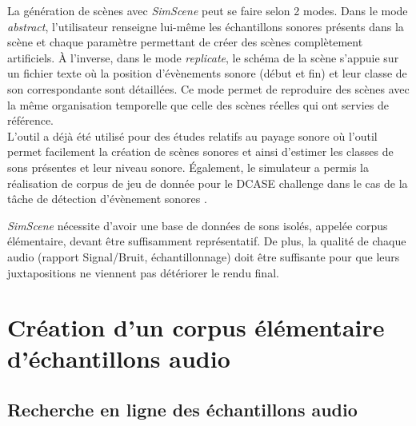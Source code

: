La génération de scènes avec \textit{SimScene} peut se faire selon 2 modes. Dans le mode \textit{abstract}, l'utilisateur renseigne lui-même les échantillons sonores présents dans la scène et chaque paramètre permettant de créer des scènes complètement artificiels. \`A l'inverse, dans le mode \textit{replicate}, le schéma de la scène s'appuie sur un fichier texte où la position d'évènements sonore (début et fin) et leur classe de son correspondante sont détaillées. Ce mode permet de reproduire des scènes avec la même organisation temporelle que celle des scènes réelles qui ont servies de référence.\\

L'outil a déjà été utilisé pour des études relatifs au payage sonore \cite{lafay2015approaching} où l'outil permet facilement la création de scènes sonores et ainsi d'estimer les classes de sons présentes et leur niveau sonore. \'Egalement, le simulateur a permis la réalisation de corpus de jeu de donnée pour le DCASE challenge \cite{stowell2015detection} dans le cas de la tâche de détection d'évènement sonores \cite{lagrange2015evaluation}. 

\textit{SimScene} nécessite d'avoir une base de données de sons isolés, appelée corpus élémentaire, devant être suffisamment représentatif. De plus, la qualité de chaque audio (rapport Signal/Bruit, échantillonnage) doit être suffisante pour que leurs juxtapositions ne viennent pas détériorer le rendu final.


\section{Création d'un corpus élémentaire d'échantillons audio}

\subsection{Recherche en ligne des échantillons audio}

